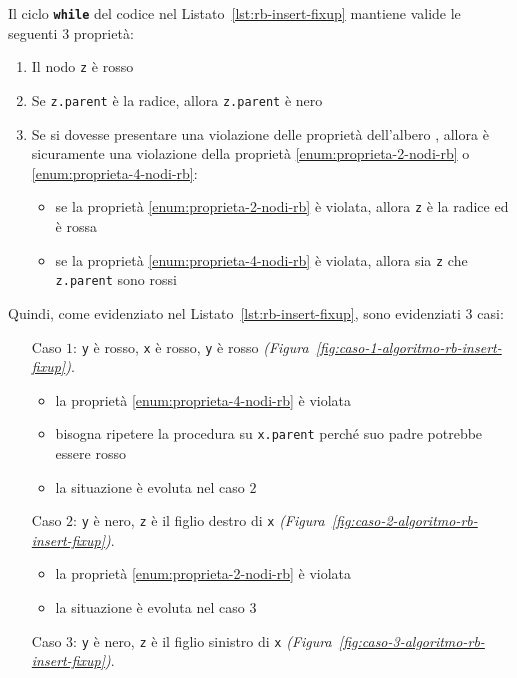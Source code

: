 \documentclass[italian, 10pt]{article}
\begin{document}
\bigskip
Il ciclo \textbf{\texttt{while}} del codice nel Listato~\ref{lst:rb-insert-fixup} mantiene valide le seguenti \(3\) proprietà:

\begin{enumerate}
  \item Il nodo \texttt{z} è rosso
  \item Se \texttt{z.parent} è la radice, allora \texttt{z.parent} è nero
  \item Se si dovesse presentare una violazione delle proprietà dell'albero \RB, allora è sicuramente una violazione della proprietà \ref{enum:proprieta-2-nodi-rb} o \ref{enum:proprieta-4-nodi-rb}:
        \begin{itemize}
          \item se la proprietà \ref{enum:proprieta-2-nodi-rb} è violata, allora \texttt{z} è la radice ed è rossa
          \item se la proprietà \ref{enum:proprieta-4-nodi-rb} è violata, allora sia \texttt{z} che \texttt{z.parent} sono rossi
        \end{itemize}
\end{enumerate}

Quindi, come evidenziato nel Listato~\ref{lst:rb-insert-fixup}, sono evidenziati \(3\) casi:

\begin{itemize}
  \item[Caso \(1\):] \texttt{y} è rosso, \texttt{x} è rosso, \texttt{y} è rosso \textit{(Figura~\ref{fig:caso-1-algoritmo-rb-insert-fixup})}.
    \begin{itemize}
      \item la proprietà \ref{enum:proprieta-4-nodi-rb} è violata
      \item bisogna ripetere la procedura su \texttt{x.parent} perché suo padre potrebbe essere rosso
      \item la situazione è evoluta nel caso \(2\)
    \end{itemize}
  \item[Caso \(2\):] \texttt{y} è nero, \texttt{z} è il figlio destro di \texttt{x} \textit{(Figura~\ref{fig:caso-2-algoritmo-rb-insert-fixup})}.
    \begin{itemize}
      \item la proprietà \ref{enum:proprieta-2-nodi-rb} è violata
      \item la situazione è evoluta nel caso \(3\)
    \end{itemize}
  \item[Caso \(3\):] \texttt{y} è nero, \texttt{z} è il figlio sinistro di \texttt{x} \textit{(Figura~\ref{fig:caso-3-algoritmo-rb-insert-fixup})}.
\end{itemize}
\end{document}
